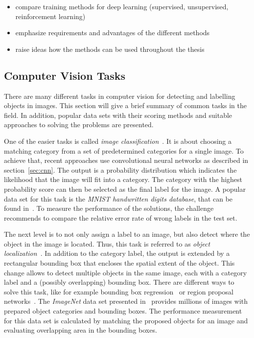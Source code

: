
\begin{itemize}
    \item compare training methods for deep learning (supervised, unsupervised, reinforcement learning)
    \item emphasize requirements and advantages of the different methods
    \item raise ideas how the methods can be used throughout the thesis
\end{itemize}

\subsection{Computer Vision Tasks}
There are many different tasks in computer vision for detecting and labelling objects in images. This section will give a brief summary of common tasks in the field. In addition, popular data sets with their scoring methods and suitable approaches to solving the problems are presented.

One of the easier tasks is called \emph{image classification}~\cite[p.~98]{DLbook16}. It is about choosing a matching category from a set of predetermined categories for a single image. To achieve that, recent approaches use convolutional neural networks as described in section~\ref{sec:cnn}. The output is a probability distribution which indicates the likelihood that the image will fit into a category. The category with the highest probability score can then be selected as the final label for the image. A popular data set for this task is the \emph{MNIST handwritten digits database}, that can be found in~\cite{mnist10}. To measure the performance of the solutions, the challenge recommends to compare the relative error rate of wrong labels in the test set.

The next level is to not only assign a label to an image, but also detect where the object in the image is located. Thus, this task is referred to as \emph{object localization}~\cite{rcnn14}. In addition to the category label, the output is extended by a rectangular bounding box that encloses the spatial extent of the object. This change allows to detect multiple objects in the same image, each with a category label and a (possibly overlapping) bounding box. There are different ways to solve this task, like for example bounding box regression~\cite{obj_detection13} or region proposal networks~\cite{ff-rcnn14}. The \emph{ImageNet} data set presented in~\cite{imgnet09} provides millions of images with prepared object categories and bounding boxes. The performance measurement for this data set is calculated by matching the proposed objects for an image and evaluating overlapping area in the bounding boxes.

